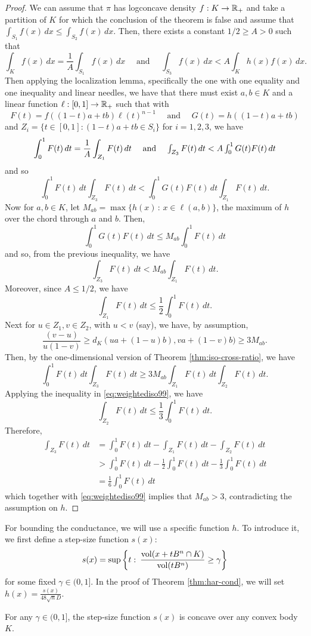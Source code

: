 \begin{proof}
We can assume that $\pi$ has logconcave density $f:K\rightarrow\mathbb{R}_{+}$
and take a partition of $K$ for which the conclusion of the theorem
is false and assume that $\int_{S_{1}}f(x)\,dx\le\int_{S_{2}}f(x)\,dx$.
Then, there exists a constant $1/2\ge A>0$ such that 
\[
\int_{K}f(x)\,dx=\frac{1}{A}\int_{S_{1}}f(x)\,dx\quad\mbox{ and }\quad\int_{S_{3}}f(x)\,dx<A\int_{K}h(x)f(x)\,dx.
\]
Then applying the localization lemma, specifically the one with one
equality and one inequality and linear needles, we have that there
must exist $a,b\in K$ and a linear function $\ell:[0,1]\rightarrow\mathbb{R}_{+}$
such that with 
\[
F(t)=f((1-t)a+tb)\ell(t)^{n-1}\quad\mbox{ and }\quad G(t)=h((1-t)a+tb)
\]
and $Z_{i}=\{t\in[0,1]:(1-t)a+tb\in S_{i}\}$ for $i=1,2,3$, we have
\[
\int^{1}_{0}F(t)\,dt=\frac{1}{A}\int_{Z_{1}}F(t)\,dt\quad\mbox{ and \ensuremath{\quad}\ensuremath{\int_{Z_{3}}F(t)\,dt<A\int^{1}_{0}G(t)F(t)\,dt}}
\]
and so 
\[
\int^{1}_{0}F(t)\,dt\int_{Z_{3}}F(t)\,dt<\int^{1}_{0}G(t)F(t)\,dt\int_{Z_{1}}F(t)\,dt.
\]
Now for $a,b\in K$, let $M_{ab}=\max\{h(x)\,:\,x\in\ell(a,b)\}$,
the maximum of $h$ over the chord through $a$ and $b$. Then, 
\[
\int^{1}_{0}G(t)F(t)\,dt\le M_{ab}\int^{1}_{0}F(t)\,dt
\]
and so, from the previous inequality, we have 
\begin{equation}
\int_{Z_{3}}F(t)\,dt<M_{ab}\int_{Z_{1}}F(t)\,dt.\label{eq:weightediso99}
\end{equation}
Moreover, since $A\le1/2$, we have 
\[
\int_{Z_{1}}F(t)\,dt\le\frac{1}{2}\int^{1}_{0}F(t)\,dt.
\]
Next for $u\in Z_{1},v\in Z_{2}$, with $u<v$ (say), we have, by
assumption, 
\[
\frac{(v-u)}{u(1-v)}\ge d_{K}(ua+(1-u)b),va+(1-v)b)\ge3M_{ab}.
\]
Then, by the one-dimensional version of Theorem \ref{thm:iso-cross-ratio},
we have 
\[
\int^{1}_{0}F(t)\,dt\int_{Z_{3}}F(t)\,dt\ge3M_{ab}\int_{Z_{1}}F(t)\,dt\int_{Z_{2}}F(t)\,dt.
\]
Applying the inequality in \ref{eq:weightediso99}, we have 
\[
\int_{Z_{2}}F(t)\,dt\le\frac{1}{3}\int^{1}_{0}F(t)\,dt.
\]
Therefore, 
\begin{align*}
\int_{Z_{3}}F(t)\,dt & =\int^{1}_{0}F(t)\,dt-\int_{Z_{1}}F(t)\,dt-\int_{Z_{2}}F(t)\,dt\\
 & >\int^{1}_{0}F(t)\,dt-\frac{1}{2}\int^{1}_{0}F(t)\,dt-\frac{1}{3}\int^{1}_{0}F(t)\,dt\\
 & =\frac{1}{6}\int^{1}_{0}F(t)\,dt
\end{align*}
which together with \ref{eq:weightediso99} implies that $M_{ab}>3$,
contradicting the assumption on $h$. 
\end{proof}
For bounding the conductance, we will use a specific function $h$.
To introduce it, we first define a step-size function $s(x)$:
\[
s(x)=\sup\left\{ t:\:\frac{\mathrm{vol}(x+tB^{n}\cap K)}{\mathrm{vol}(tB^{n})}\ge\gamma\right\} 
\]
for some fixed $\gamma\in(0,1]$. In the proof of Theorem \ref{thm:har-cond},
we will set $h(x)=\frac{s(x)}{48\sqrt{n}D}$. 
\begin{lem}
For any $\gamma\in(0,1]$, the step-size function $s(x)$ is concave
over any convex body $K$.
\end{lem}


